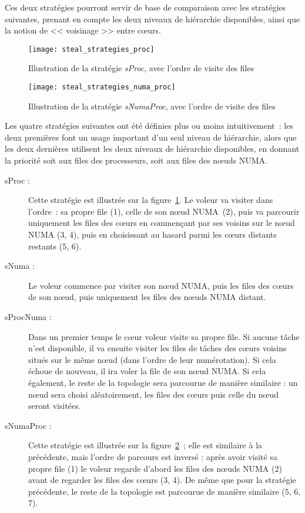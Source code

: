 Ces deux stratégies pourront servir de base de comparaison avec les stratégies suivantes, prenant en compte les deux niveaux de hiérarchie disponibles, ainsi que la notion de << voisinage >> entre cœurs.

\begin{figure}[t!]
  \centering
  \texttt{[image: steal\_strategies\_proc]}
  \caption{Illustration de la stratégie \emph{sProc}, avec l'ordre de visite des files}\label{fig:openmp:runtime:steal_proc}
\end{figure}

\begin{figure}[h!]
  \centering
  \texttt{[image: steal\_strategies\_numa\_proc]}
  \caption{Illustration de la stratégie \emph{sNumaProc}, avec l'ordre de visite des files}\label{fig:openmp:runtime:steal_numa_proc}
\end{figure}

Les quatre stratégies suivantes ont été définies plus ou moins intuitivement~: les deux premières font un usage important d'un seul niveau de hiérarchie, alors que les deux dernières utilisent les deux niveaux de hiérarchie disponibles, en donnant la priorité soit aux files des processeurs, soit aux files des nœuds NUMA.

\begin{description}
  \item [sProc :] Cette stratégie est illustrée sur la figure~\ref{fig:openmp:runtime:steal_proc}. Le voleur va visiter dans l'ordre~: sa propre file (1), celle de son nœud NUMA (2), puis va parcourir uniquement les files des cœurs en commençant par ses voisins sur le nœud NUMA (3, 4), puis en choisissant au hasard parmi les cœurs distants restants (5, 6).
  \item [sNuma :] Le voleur commence par visiter son nœud NUMA, puis les files des cœurs de son nœud, puis uniquement les files des nœuds NUMA distant.
  \item [sProcNuma :] Dans un premier temps le cœur voleur visite sa propre file. Si aucune tâche n'est disponible, il va ensuite visiter les files de tâches des cœurs voisins situés sur le même nœud (dans l'ordre de leur numérotation).
    Si cela échoue de nouveau, il ira voler la file de son nœud NUMA.
    Si cela également, le reste de la topologie sera parcourue de manière similaire : un nœud sera choisi aléatoirement, les files des cœurs puis celle du nœud seront visitées.
  \item [sNumaProc :] Cette stratégie est illustrée sur la figure~\ref{fig:openmp:runtime:steal_numa_proc}~; elle est similaire à la précédente, mais l'ordre de parcours est inversé : après avoir visité sa propre file (1) le voleur regarde d'abord les files des nœuds NUMA (2) avant de regarder les files des cœurs (3, 4). De même que pour la stratégie précédente, le reste de la topologie est parcourue de manière similaire (5, 6, 7).
\end{description}


